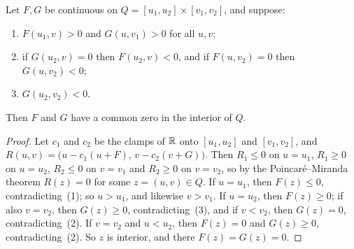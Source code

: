 \begin{lemma}\label{lem:crossed}
Let $F,G$ be continuous on $Q=[u_1,u_2]\times[v_1,v_2]$, and suppose:
\begin{enumerate}[label=\textup{(\arabic*)}]
\item $F(u_1,v)>0$ and $G(u,v_1)>0$ for all $u,v$;
\item if $G(u_2,v)=0$ then $F(u_2,v)<0$, and if $F(u,v_2)=0$ then $G(u,v_2)<0$;
\item $G(u_2,v_2)<0$.
\end{enumerate}
Then $F$ and $G$ have a common zero in the interior of $Q$.
\end{lemma}

\begin{proof}
Let $c_1$ and $c_2$ be the clamps of $\mathbb{R}$ onto $[u_1,u_2]$ and $[v_1,v_2]$,
and $R(u,v)=\bigl(u-c_1(u+F),\,v-c_2(v+G)\bigr)$. Then $R_1\le0$ on $u=u_1$,
$R_1\ge0$ on $u=u_2$, $R_2\le0$ on $v=v_1$ and $R_2\ge0$ on $v=v_2$, so by the
Poincar\'e--Miranda theorem $R(z)=0$ for some $z=(u,v)\in Q$. If $u=u_1$, then
$F(z)\le0$, contradicting~(1); so $u>u_1$, and likewise $v>v_1$. If $u=u_2$,
then $F(z)\ge0$; if also $v=v_2$, then $G(z)\ge0$, contradicting~(3), and if
$v<v_2$, then $G(z)=0$, contradicting~(2). If $v=v_2$ and $u<u_2$, then
$F(z)=0$ and $G(z)\ge0$, contradicting~(2). So $z$ is interior, and there
$F(z)=G(z)=0$.
\end{proof}
